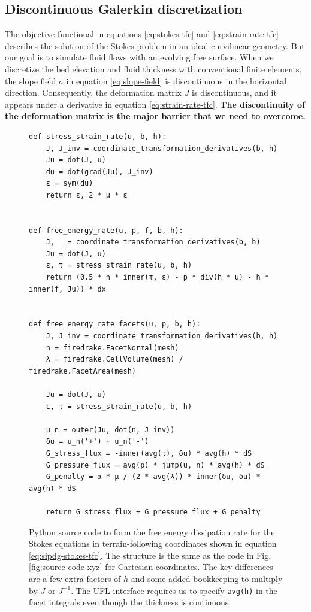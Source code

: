 \documentclass[gmd, manuscript]{copernicus}
\begin{document}
\subsection{Discontinuous Galerkin discretization}

The objective functional in equations \eqref{eq:stokes-tfc} and \eqref{eq:strain-rate-tfc} describes the solution of the Stokes problem in an ideal curvilinear geometry.
But our goal is to simulate fluid flows with an evolving free surface.
When we discretize the bed elevation and fluid thickness with conventional finite elements, the slope field $\sigma$ in equation \eqref{eq:slope-field} is discontinuous in the horizontal direction.
Consequently, the deformation matrix $J$ is discontinuous, and it appears under a derivative in equation \eqref{eq:strain-rate-tfc}.
\textbf{The discontinuity of the deformation matrix is the major barrier that we need to overcome.}

\begin{figure}
\begin{lstlisting}
def stress_strain_rate(u, b, h):
    J, J_inv = coordinate_transformation_derivatives(b, h)
    Ju = dot(J, u)
    du = dot(grad(Ju), J_inv)
    ε = sym(du)
    return ε, 2 * μ * ε


def free_energy_rate(u, p, f, b, h):
    J, _ = coordinate_transformation_derivatives(b, h)
    Ju = dot(J, u)
    ε, τ = stress_strain_rate(u, b, h)
    return (0.5 * h * inner(τ, ε) - p * div(h * u) - h * inner(f, Ju)) * dx


def free_energy_rate_facets(u, p, b, h):
    J, J_inv = coordinate_transformation_derivatives(b, h)
    n = firedrake.FacetNormal(mesh)
    λ = firedrake.CellVolume(mesh) / firedrake.FacetArea(mesh)

    Ju = dot(J, u)
    ε, τ = stress_strain_rate(u, b, h)

    u_n = outer(Ju, dot(n, J_inv))
    δu = u_n('+') + u_n('-')
    G_stress_flux = -inner(avg(τ), δu) * avg(h) * dS
    G_pressure_flux = avg(p) * jump(u, n) * avg(h) * dS
    G_penalty = α * μ / (2 * avg(λ)) * inner(δu, δu) * avg(h) * dS

    return G_stress_flux + G_pressure_flux + G_penalty
\end{lstlisting}
\caption{
    Python source code to form the free energy dissipation rate for the Stokes equations in terrain-following coordinates shown in equation \eqref{eq:sipdg-stokes-tfc}.
    The structure is the same as the code in Fig. \ref{fig:source-code-xyz} for Cartesian coordinates.
    The key differences are a few extra factors of $h$ and some added bookkeeping to multiply by $J$ or $J^{-1}$.
    The UFL interface requires us to specify \texttt{avg(h)} in the facet integrals even though the thickness is continuous.
}
\label{fig:source-code-tfc}
\end{figure}
\end{document}
